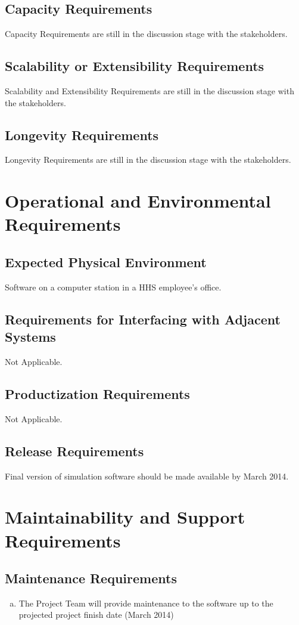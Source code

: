 \documentclass[paper=letter, fontsize=10pt]{scrartcl}
\numberwithin{equation}{section}		%
\numberwithin{figure}{section}			%
\numberwithin{table}{section}				%
\begin{document}
\subsection{Capacity Requirements}
Capacity Requirements are still in the discussion stage with the stakeholders.
\subsection{Scalability or Extensibility Requirements}
Scalability and Extensibility Requirements are still in the discussion stage with the stakeholders.
\subsection{Longevity Requirements}
Longevity Requirements are still in the discussion stage with the stakeholders.

\section{Operational and Environmental Requirements}
\subsection{Expected Physical Environment}
Software on a computer station in a HHS employee's office.
\subsection{Requirements for Interfacing with Adjacent Systems}
Not Applicable.
\subsection{Productization Requirements}
Not Applicable.
\subsection{Release Requirements}
Final version of simulation software should be made available by March 2014.

\section{Maintainability and Support Requirements}
\subsection{Maintenance Requirements}
	\begin{enumerate}[(a)]
		\item The Project Team will provide maintenance to the software up to the projected project finish date (March 2014)
	\end{enumerate}
\end{document}

